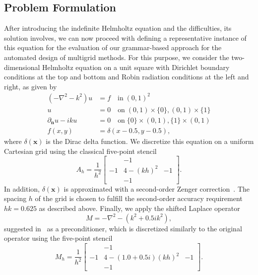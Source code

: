 \subsection{Problem Formulation}
After introducing the indefinite Helmholtz equation and the difficulties, its solution involves, we can now proceed with defining a representative instance of this equation for the evaluation of our grammar-based approach for the automated design of multigrid methods.
For this purpose, we consider the two-dimensional Helmholtz equation on a unit square with Dirichlet boundary conditions at the top and bottom and Robin radiation conditions at the left and right, as given by
\begin{equation}
	\label{eq:helmholtz-test-problem}
	\begin{split}
		(-\nabla ^{2} - k^{2}) u & = f \quad \text{in} \; \left( 0, 1 \right)^2 \\
		u & = 0 \quad \text{on} \; \left( 0, 1 \right) \times \{0\}, \left( 0, 1 \right) \times \{1\} \\
		\partial_{\mathbf{n}} u - iku & = 0 \quad \text{on} \; \{0\} \times \left( 0, 1 \right), \{1\} \times \left( 0, 1 \right) \\
		f(x, y) & = \delta(x - 0.5, y - 0.5),
	\end{split}
\end{equation}
where $\delta(\bm{x})$ is the Dirac delta function.
We discretize this equation on a uniform Cartesian grid using the classical five-point stencil
\begin{equation*}
	A_h = \frac{1}{h^2} \begin{bmatrix}
		& -1 & \\
		-1 & 4 - (k h)^2 & -1 \\
		& -1 &  
	\end{bmatrix}.
\end{equation*}
In addition, $\delta(\bm{x})$ is approximated with a second-order Zenger correction~\cite{koestler2004extrapolation}.
The spacing $h$ of the grid is chosen to fulfill the second-order accuracy requirement $h k = 0.625$ as described above.
Finally, we apply the shifted Laplace operator
\begin{equation*}
	M = -\nabla^{2} - (k^{2} + 0.5 i k^{2}),
\end{equation*}
suggested in~\cite{erlangga2008advances} as a preconditioner, which is discretized similarly to the original operator using the five-point stencil
\begin{equation*}
	M_h = \frac{1}{h^2} \begin{bmatrix}
		& -1 & \\
		-1 & 4 - (1.0 + 0.5i)(k h)^2 & -1 \\
		& -1 &  
	\end{bmatrix}.
\end{equation*}
